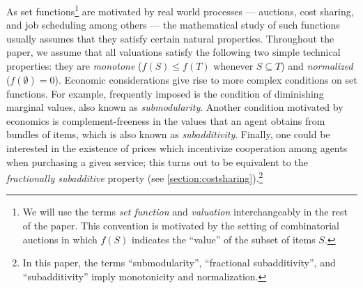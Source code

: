 \documentclass[11pt]{article}%
\numberwithin{theorem}{subsection}
\newcommand{\mattnote}[1]{\textcolor{blue}{#1}}
\begin{document}

As set functions\footnote{We will use the terms \textit{set function} and \textit{valuation} interchangeably in the rest of the paper. This convention is motivated by the setting of combinatorial auctions in which $f(S)$ indicates the ``value'' of the subset of items $S.$} are motivated by real world processes --- auctions, cost sharing, and job scheduling among others --- the mathematical study of such functions usually assumes that they satisfy certain natural properties. Throughout the paper, we assume that all valuations satisfy the following two simple technical properties: they are \textit{monotone} ($f(S)\le f(T)$ whenever $S\subseteq T$) and \textit{normalized} ($f(\emptyset) = 0$). Economic considerations give rise to more complex conditions on set functions.
For example, frequently imposed is the condition of diminishing marginal values, also known as \textit{submodularity}. Another condition motivated by economics is complement-freeness in the values that an agent obtains from bundles of items, which is also known as \textit{subadditivity}. Finally, one could be interested in the existence of prices which incentivize cooperation among agents when purchasing a given service; this turns out to be equivalent to the \textit{fractionally subadditive} property (see \cref{section:costsharing}).\footnote{In this paper, the terms ``submodularity'', ``fractional subadditivity'', and ``subadditivity'' imply monotonicity and normalization.}



\end{document}
